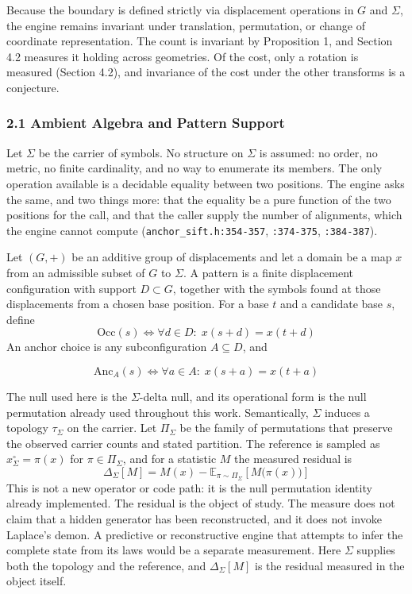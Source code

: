 Because the boundary is defined strictly via displacement operations in $G$ and $\Sigma$, the
engine remains invariant under translation, permutation, or change of coordinate representation.
The count is invariant by Proposition 1, and Section 4.2 measures it holding across geometries. Of
the cost, only a rotation is measured (Section 4.2), and invariance of the cost under the other
transforms is a conjecture.

\subsubsection{2.1 Ambient Algebra and Pattern Support}

Let \(\Sigma\) be the carrier of symbols. No structure on \(\Sigma\) is assumed: no order, no metric, no finite cardinality, and no way to enumerate its members. The only operation available is a decidable equality between two positions. The engine asks the same, and two things more: that the equality be a pure function of the two positions for the call, and that the caller supply the number of alignments, which the engine cannot compute (\texttt{anchor\_sift.h:354-357}, \texttt{:374-375}, \texttt{:384-387}).

Let \((G,+)\) be an additive group of displacements and let a domain be a map \(x\) from an admissible subset of \(G\) to \(\Sigma\). A pattern is a finite displacement configuration with support \(D \subset G\), together with the symbols found at those displacements from a chosen base position. For a base \(t\) and a candidate base \(s\), define
\[
  \mathrm{Occ}(s) \iff \forall d \in D:\; x(s+d) = x(t+d)
\]
An anchor choice is any subconfiguration \(A \subseteq D\), and

\[
  \mathrm{Anc}_A(s) \iff \forall a \in A:\; x(s+a) = x(t+a)
\]

The null used here is the \(\Sigma\)-delta null, and its operational form is the null permutation already used throughout this work. Semantically, \(\Sigma\) induces a topology \(\tau_\Sigma\) on the carrier. Let \(\Pi_\Sigma\) be the family of permutations that preserve the observed carrier counts and stated partition. The reference is sampled as \(x^\circ_\Sigma = \pi(x)\) for \(\pi \in \Pi_\Sigma\), and for a statistic \(M\) the measured residual is
\[
  \Delta_\Sigma[M] = M(x) - \mathbb{E}_{\pi \sim \Pi_\Sigma}\!\left[M\bigl(\pi(x)\bigr)\right]
\]
This is not a new operator or code path: it is the null permutation identity already implemented. The residual is the object of study. The measure does not claim that a hidden generator has been reconstructed, and it does not invoke Laplace's demon. A predictive or reconstructive engine that attempts to infer the complete state from its laws would be a separate measurement. Here \(\Sigma\) supplies both the topology and the reference, and \(\Delta_\Sigma[M]\) is the residual measured in the object itself.

